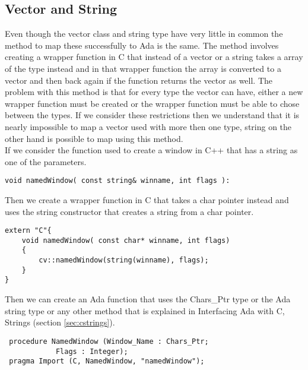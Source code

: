 \subsection{Vector and String}\label{sec:vec}
Even though the vector class and string type have very little in common the method to map these successfully to Ada is the same. The method involves creating a wrapper function in C that instead of a vector or a string takes a array of the type instead and in that wrapper function the array is converted to a vector and then back again if the function returns the vector as well. The problem with this method is that for every type the vector can have, either a new wrapper function must be created or the wrapper function must be able to chose between the types. If we consider these restrictions then we understand that it is nearly impossible to map a vector used with more then one type, string on the other hand is possible to map using this method. 
\\
If we consider the function used to create a window in C++ that has a string as one of the parameters.
\begin{lstlisting}
void namedWindow( const string& winname, int flags ):
\end{lstlisting}
Then we create a wrapper function in C that takes a char pointer instead and uses the string constructor that creates a string from a char pointer.
\begin{lstlisting}
extern "C"{
	void namedWindow( const char* winname, int flags)
	{
		cv::namedWindow(string(winname), flags);
	}
}
\end{lstlisting}
Then we can create an Ada function that uses the Chars_Ptr type or the Ada string type or any other method that is explained in Interfacing Ada with C, Strings (section \ref{sec:cstrings}).
\begin{lstlisting}
 procedure NamedWindow (Window_Name : Chars_Ptr; 
			Flags : Integer);
 pragma Import (C, NamedWindow, "namedWindow");
\end{lstlisting}